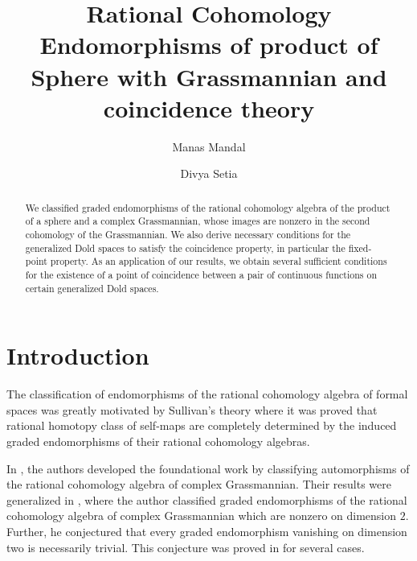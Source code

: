 \documentclass{amsart}
\title[Graded Endomorphisms of $H^*(\mathbb{S}^m \times \mathbb{C}G_{n,k};\mathbb Q)$]{%
Rational Cohomology Endomorphisms of product of Sphere with Grassmannian and coincidence theory%
}
\author[M. Mandal]{Manas Mandal}
\author[D. Setia]{Divya Setia}
\begin{document}
	\begin{abstract}
		We classified graded endomorphisms of the rational cohomology algebra of the product of a sphere and a complex Grassmannian, whose images are nonzero  in the second cohomology of the Grassmannian.
		We also derive necessary conditions for the generalized Dold spaces to satisfy the coincidence property, in particular the fixed-point property. As an application of our results, we obtain several sufficient conditions for the existence of a point of coincidence between a pair of continuous functions on certain generalized Dold spaces. 
	\end{abstract}
	
	\maketitle
	
	\section{Introduction} \label{intro}
	The classification of endomorphisms of the rational cohomology algebra of formal spaces was greatly motivated by Sullivan's theory where it was  proved that rational homotopy class of self-maps are completely determined by the induced graded endomorphisms of their rational cohomology algebras. 
	
	In \cite{brewster}, %
the authors developed %
the foundational work by classifying automorphisms of the rational cohomology algebra of complex Grassmannian. Their results were generalized in \cite{hoffman}, where the author classified graded endomorphisms of the rational cohomology algebra of %
complex Grassmannian which are nonzero %
on dimension $2$. Further, he conjectured that every graded endomorphism  vanishing on dimension two is %
necessarily trivial. This conjecture was proved %
in \cite{glover-homer} for several cases.
	
\end{document}
